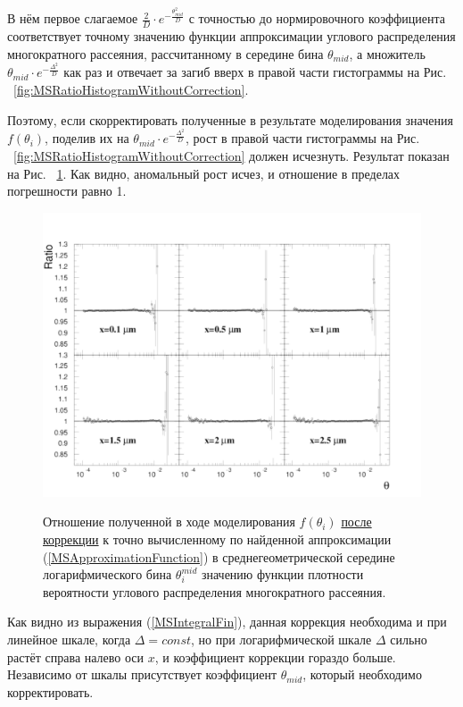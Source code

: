 \documentclass[a4paper,12pt]{article}
\begin{document}
\begin{large}
	В нём первое слагаемое $\frac{2}{D} \cdot e^{-\frac{\theta^2_{mid}}{D}}$ с точностью до нормировочного коэффициента соответствует точному значению функции аппроксимации углового распределения многократного рассеяния, рассчитанному в середине бина $\theta_{mid}$, а множитель $\theta_{mid} \cdot e^{-\frac{\Delta^2}{D}}$ как раз и отвечает за загиб вверх в правой части гистограммы на Рис. ~\ref{fig:MSRatioHistogramWithoutCorrection}.
	
	Поэтому, если скорректировать полученные в результате моделирования значения $f(\theta_i)$, поделив их на $\theta_{mid} \cdot e^{-\frac{\Delta^2}{D}}$, рост в правой части гистограммы на Рис. ~\ref{fig:MSRatioHistogramWithoutCorrection} должен исчезнуть.
	Результат показан на Рис. ~\ref{fig:MSRatioHistogramWithCorrection}.
	Как видно, аномальный рост исчез, и отношение в пределах погрешности равно 1.
	
\begin{figure}[ht]
{
   \includegraphics[width=0.99\linewidth]{images/ratioms_with_correction.pdf}
}
\caption{Отношение полученной в ходе моделирования $f(\theta_i)$ \underline{после коррекции} к точно вычисленному по найденной аппроксимации (\ref{MSApproximationFunction}) в среднегеометрической середине логарифмического бина $\theta^{mid}_i$ значению функции плотности вероятности углового распределения многократного рассеяния.}
\label{fig:MSRatioHistogramWithCorrection}
\end{figure}

	Как видно из выражения (\ref{MSIntegralFin}), данная коррекция необходима и при линейное шкале, когда $\Delta=const$, но при логарифмической шкале $\Delta$ сильно растёт справа налево оси $x$, и коэффициент коррекции гораздо больше.
	Независимо от шкалы присутствует коэффициент $\theta_{mid}$, который необходимо корректировать.


\end{large}
\end{document}
